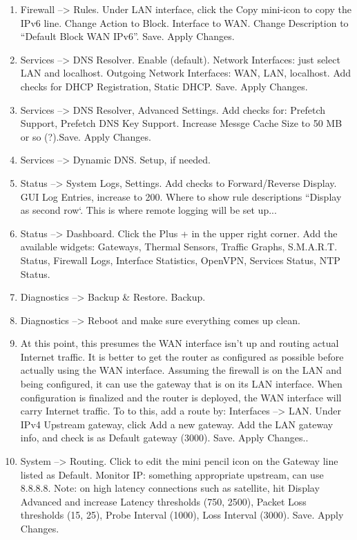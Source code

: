 \begin{enumerate}
 \item Firewall --> Rules. Under LAN interface, click the Copy mini-icon to copy the IPv6 line. Change Action to Block. Interface to WAN. Change Description to ``Default Block WAN IPv6''. Save. Apply Changes.
 \item Services --> DNS Resolver. Enable (default). Network Interfaces: just select LAN and localhost. Outgoing Network Interfaces: WAN, LAN, localhost. Add checks for DHCP Registration, Static DHCP. Save. Apply Changes.
 \item Services --> DNS Resolver, Advanced Settings. Add checks for: Prefetch Support, Prefetch DNS Key Support. Increase Messge Cache Size to 50 MB or so (?).Save. Apply Changes.
 \item Services --> Dynamic DNS. Setup, if needed.
 \item Status --> System Logs, Settings. Add checks to Forward/Reverse Display. GUI Log Entries, increase to 200. Where to show rule descriptions ``Display as second row`. This is where remote logging will be set up... 
 \item Status --> Dashboard. Click the Plus + in the upper right corner. Add the available widgets: Gateways, Thermal Sensors, Traffic Graphs, S.M.A.R.T. Status, Firewall Logs, Interface Statistics, OpenVPN, Services Status, NTP Status.
 \item Diagnostics --> Backup \& Restore. Backup.
 \item Diagnostics --> Reboot and make sure everything comes up clean.
 \item At this point, this presumes the WAN interface isn't up and routing actual Internet traffic. It is better to get the router as configured as possible before actually using the WAN interface. Assuming the firewall is on the LAN and being configured, it can use the gateway that is on its LAN interface. When configuration is finalized and the router is deployed, the WAN interface will carry Internet traffic. To to this, add a route by: Interfaces --> LAN. Under IPv4 Upstream gateway, click Add a new gateway. Add the LAN gateway info, and check is as Default gateway (3000). Save. Apply Changes..
 \item System --> Routing. Click to edit the mini pencil icon on the Gateway line listed as Default. Monitor IP: something appropriate upstream, can use 8.8.8.8. Note: on high latency connections such as satellite, hit Display Advanced and increase Latency thresholds (750, 2500), Packet Loss thresholds (15, 25), Probe Interval (1000), Loss Interval (3000). Save. Apply Changes.

\end{enumerate}
